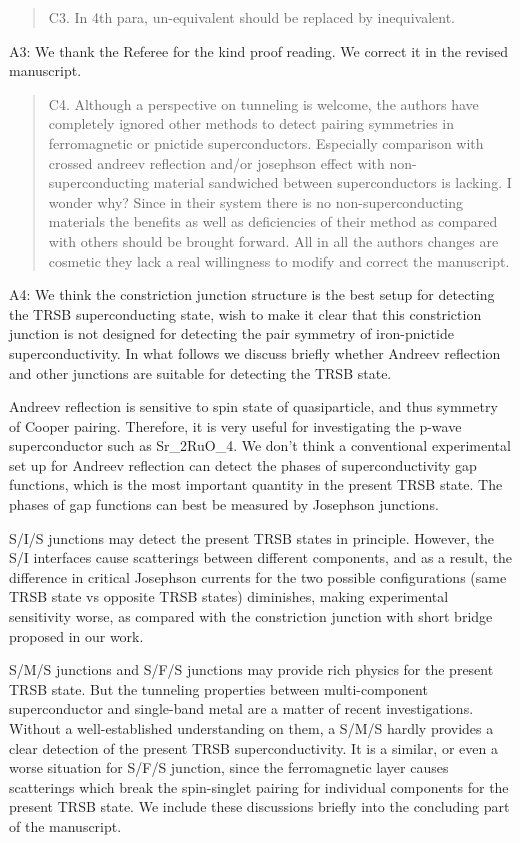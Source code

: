 \documentclass[11pt]{article}
\begin{document}
\begin{quote}
C3. In 4th para, un-equivalent should be replaced by inequivalent.
\end{quote}

A3: We thank the Referee for the kind proof reading. We correct it in
the revised manuscript.

\begin{quote}
C4. Although a perspective on tunneling is welcome, the authors have
completely ignored other methods to detect pairing symmetries in
ferromagnetic or pnictide superconductors. Especially comparison with
crossed andreev reflection and/or josephson effect with
non-superconducting material sandwiched between superconductors is
lacking. I wonder why? Since in their system there is no
non-superconducting materials the benefits as well as deficiencies of
their method as compared with others should be brought forward. All in
all the authors changes are cosmetic they lack a real willingness to
modify and correct the manuscript.
\end{quote}

A4: We think the constriction junction structure is the best setup for
detecting the TRSB superconducting state, wish to make it clear that
this constriction junction is not designed for detecting the pair
symmetry of iron-pnictide superconductivity. In what follows we discuss
briefly whether Andreev reflection and other junctions are suitable for
detecting the TRSB state.

Andreev reflection is sensitive to spin state of quasiparticle, and thus
symmetry of Cooper pairing. Therefore, it is very useful for
investigating the p-wave superconductor such as Sr\_2RuO\_4. We don't
think a conventional experimental set up for Andreev reflection can
detect the phases of superconductivity gap functions, which is the most
important quantity in the present TRSB state. The phases of gap
functions can best be measured by Josephson junctions.

S/I/S junctions may detect the present TRSB states in principle.
However, the S/I interfaces cause scatterings between different
components, and as a result, the difference in critical Josephson
currents for the two possible configurations (same TRSB state vs
opposite TRSB states) diminishes, making experimental sensitivity worse,
as compared with the constriction junction with short bridge proposed in
our work.

S/M/S junctions and S/F/S junctions may provide rich physics for the
present TRSB state. But the tunneling properties between multi-component
superconductor and single-band metal are a matter of recent
investigations. Without a well-established understanding on them, a
S/M/S hardly provides a clear detection of the present TRSB
superconductivity. It is a similar, or even a worse situation for S/F/S
junction, since the ferromagnetic layer causes scatterings which break
the spin-singlet pairing for individual components for the present TRSB
state. We include these discussions briefly into the concluding part of
the manuscript.
\end{document}
